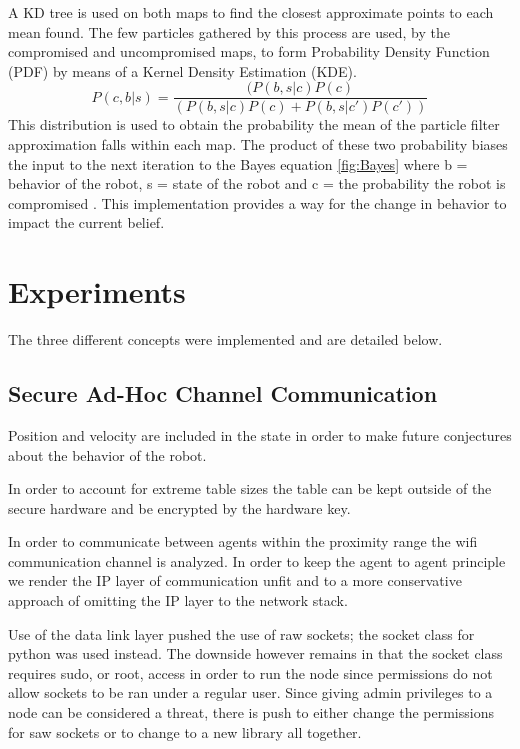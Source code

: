 \documentclass[conference]{IEEEtran}
\begin{document}
A KD tree is used on both maps to find the closest approximate points to each mean found. The few particles gathered by this process are used, by the compromised and uncompromised maps, to form Probability Density Function (PDF) by means of a Kernel Density Estimation (KDE). 
\begin{equation}
 P(c,b|s) =\frac {(P(b,s|c)P(c)} {(P(b,s|c)P(c) + 
 P(b,s|c' )P(c' ))} 
 \label{fig:Bayes}
\end{equation}
This distribution is used to obtain the probability the mean of the particle filter approximation falls within each map. The product of these two probability biases the input to the next iteration to the Bayes equation \ref{fig:Bayes} where b = behavior of the robot, s = state of the robot and c = the probability the robot is compromised \cite{Thrun2002Probabilistic}. This implementation provides a way for the change in behavior to impact the current belief.


\section{Experiments} \label{Experiments}

The three different concepts were implemented and are detailed below.

\subsection{Secure Ad-Hoc Channel Communication}

Position and velocity are included in the state in order to make future conjectures about the behavior of the robot.

In order to account for extreme table sizes the table can be kept outside of the secure hardware and be encrypted by the hardware key.

In order to communicate between agents within the proximity range the wifi communication channel is analyzed. In order to keep the agent to agent principle we render the IP layer of communication unfit and to a more conservative approach of omitting the IP layer to the network stack.

Use of the data link layer pushed the use of raw sockets; the socket class for python was used instead. The downside however remains in that the socket class requires sudo, or root, access in order to run the node since permissions do not allow sockets to be ran under a regular user. Since giving admin privileges to a node can be considered a threat, there is push to either change the permissions for saw sockets or to change to a new library all together.
\end{document}
